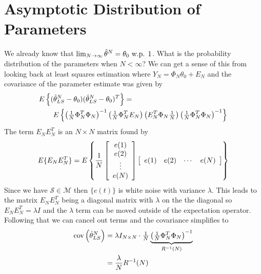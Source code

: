 \section{Asymptotic Distribution of Parameters}
We already know that $\lim_{N\to\infty}\hat{\theta}^N=\theta_0 \text{ w.p. } 1$. What is the probability distribution of the parameters when $N<\infty$? We can get a sense of this from looking back at least squares estimation where $Y_N=\Phi_N\theta_0+E_N$ and the covariance of the parameter estimate was given by
\begin{align*}
&E\left\lbrace (\hat{\theta}_{LS}^N-\theta_0)(\hat{\theta}_{LS}^N-\theta_0)^T\right\rbrace = \\
&\qquad E\left\lbrace \left(\tfrac{1}{N}\Phi_N^T\Phi_N\right)^{-1} \left(\tfrac{1}{N}\Phi_N^TE_N\right) \left(E_N^T\Phi_N\tfrac{1}{N}\right) \left(\tfrac{1}{N}\Phi_N^T\Phi_N\right)^{-1} \right\rbrace
\end{align*}
The term $E_NE_N^T$ is an $N\times N$ matrix found by
$$E\{E_NE_N^T\} = E\left\lbrace \frac{1}{N} \left[\begin{array}{c} e(1) \\ e(2) \\ \vdots \\ e(N) \end{array}\right] \left[\begin{array}{c c c c} e(1) & e(2) & \cdots & e(N) \end{array}\right]\right\rbrace$$
Since we have $\mathcal{S}\in\mathcal{M}$ then $\{e(t)\}$ is white noise with variance $\lambda$. This leads to the matrix $E_NE_N^T$ being a diagonal matrix with $\lambda$ on the the diagonal so $E_NE_N^T=\lambda I$ and the $\lambda$ term can be moved outside of the expectation operator. Following that we can cancel out terms and the covariance simplifies to
\begin{align*}
\text{cov}\left(\hat{\theta}_{LS}^N\right) &= \lambda I_{N\times N}\cdot \tfrac{1}{N}\underbrace{\left(\tfrac{1}{N}\Phi_N^T\Phi_N\right)^{-1}}_{R^{-1}(N)} \\
&= \frac{\lambda}{N}R^{-1}(N)
\end{align*}

